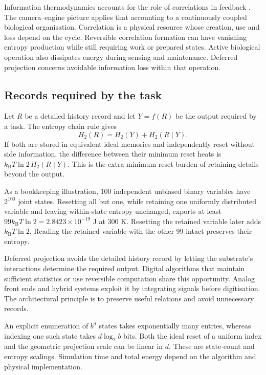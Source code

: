 \documentclass[10pt,a4paper,twocolumn]{article}
\newcommand{\kB}{k_{\mathrm B}}
\numberwithin{equation}{section}
\begin{document}
Information thermodynamics accounts for the role of correlations in feedback \cite{sagawa2010,parrondo2015}. The camera--engine picture applies that accounting to a continuously coupled biological organisation. Correlation is a physical resource whose creation, use and loss depend on the cycle. Reversible correlation formation can have vanishing entropy production while still requiring work or prepared states. Active biological operation also dissipates energy during sensing and maintenance. Deferred projection concerns avoidable information loss within that operation.

\subsection{Records required by the task}

Let $R$ be a detailed history record and let $Y=f(R)$ be the output required by a task. The entropy chain rule gives
\begin{equation}
H_2(R)=H_2(Y)+H_2(R\mid Y).
\label{eq:recordchain}
\end{equation}
If both are stored in equivalent ideal memories and independently reset without side information, the difference between their minimum reset heats is $\kB T\ln2\,H_2(R\mid Y)$. This is the extra minimum reset burden of retaining details beyond the output.

As a bookkeeping illustration, 100 independent unbiased binary variables have $2^{100}$ joint states. Resetting all but one, while retaining one uniformly distributed variable and leaving within-state entropy unchanged, exports at least $99\kB T\ln2=2.8423\times10^{-19}$ J at $300$ K. Resetting the retained variable later adds $\kB T\ln2$. Reading the retained variable with the other 99 intact preserves their entropy.

Deferred projection avoids the detailed history record by letting the substrate's interactions determine the required output. Digital algorithms that maintain sufficient statistics or use reversible computation share this opportunity. Analog front ends and hybrid systems exploit it by integrating signals before digitisation. The architectural principle is to preserve useful relations and avoid unnecessary records.

An explicit enumeration of $b^d$ states takes exponentially many entries, whereas indexing one such state takes $d\log_2b$ bits. Both the ideal reset of a uniform index and the geometric projection scale can be linear in $d$. These are state-count and entropy scalings. Simulation time and total energy depend on the algorithm and physical implementation.
\end{document}

